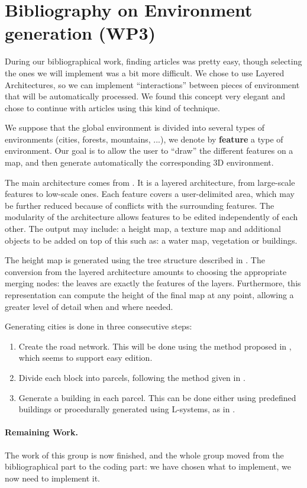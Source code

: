 \section{Bibliography on Environment generation (WP3)}
\label{WP3}

During our bibliographical work, finding articles was pretty easy, though selecting the ones we will implement was a bit more difficult. We chose to use Layered Architectures, so we can implement ``interactions'' between pieces of environment that will be automatically processed. We found this concept very elegant and chose to continue with articles using this kind of technique.

We suppose that the global environment is divided into several types of environments (cities, forests, mountains, ...), we denote by \textbf{feature} a type of environment. Our goal is to allow the user to ``draw'' the different features on a map, and then generate automatically the corresponding 3D environment.

The main architecture comes from \cite{DeclarativeArchitecture}. It is a layered architecture, from large-scale features to low-scale ones. Each feature covers a user-delimited area, which may be further reduced because of conflicts with the surrounding features. The modularity of the architecture allows features to be edited independently of each other. The output may include: a height map, a texture map and additional objects to be added on top of this such as: a water map, vegetation or buildings.

The height map is generated using the tree structure described in \cite{FeatureTree}. The conversion from the layered architecture amounts to choosing the appropriate merging nodes: the leaves are exactly the features of the layers. Furthermore, this representation can compute the height of the final map at any point, allowing a greater level of detail when and where needed.

Generating cities is done in three consecutive steps:
\begin{enumerate}
\item Create the road network. This will be done using the method proposed in \cite{StreetTensors}, which seems to support easy edition.
  
\item Divide each block into parcels, following the method given in \cite{PGParcels}.
  
\item Generate a building in each parcel. This can be done either using predefined buildings or procedurally generated using L-systems, as in \cite{FLSystem}.
\end{enumerate}


\paragraph{Remaining Work.} The work of this group is now finished, and the whole group moved from the bibliographical part to the coding part: we have chosen what to implement, we now need to implement it.
